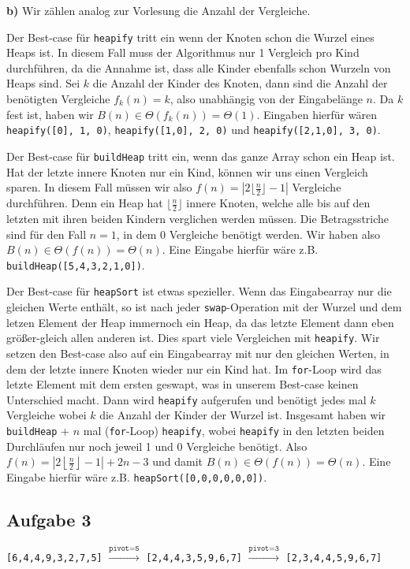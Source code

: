 \documentclass[a4paper,graphics,11pt]{article}
\newcommand{\aufgabe}[1]{\subsection*{Aufgabe #1}}
\begin{document}
\textbf{b)}
Wir zählen analog zur Vorlesung die Anzahl der Vergleiche.

Der Best-case für \texttt{heapify} tritt ein wenn der Knoten schon die
Wurzel eines Heaps ist. In diesem Fall muss der Algorithmus nur 1 Vergleich pro Kind durchführen, da die Annahme ist,
dass alle Kinder ebenfalls schon Wurzeln von Heaps sind.
Sei $k$ die Anzahl der Kinder des Knoten, dann sind die Anzahl der benötigten Vergleiche $f_k(n) = k$, also
unabhängig von der Eingabelänge $n$. Da $k$ fest ist, haben wir $B(n) \in \Theta(f_k(n)) = \Theta(1)$.
Eingaben hierfür wären \texttt{heapify([0], 1, 0)}, \texttt{heapify([1,0], 2, 0)} und \texttt{heapify([2,1,0], 3, 0)}.

Der Best-case für \texttt{buildHeap} tritt ein, wenn das ganze Array schon ein Heap ist.
Hat der letzte innere Knoten nur ein Kind, können wir uns einen Vergleich sparen. In diesem Fall müssen wir also
$f(n) = |2\lfloor \frac{n}{2} \rfloor-1|$ Vergleiche durchführen. Denn ein Heap hat $\lfloor \frac{n}{2} \rfloor$ innere
Knoten, welche alle bis auf den letzten mit ihren beiden Kindern verglichen werden müssen.
Die Betragsstriche sind für den Fall $n=1$, in dem 0 Vergleiche benötigt werden.
Wir haben also $B(n) \in \Theta(f(n)) = \Theta(n)$.
Eine Eingabe hierfür wäre z.B. \texttt{buildHeap([5,4,3,2,1,0])}.

Der Best-case für \texttt{heapSort} ist etwas spezieller. Wenn das Eingabearray nur die gleichen Werte enthält, so
ist nach jeder \texttt{swap}-Operation mit der Wurzel und dem letzen Element der Heap immernoch ein Heap, da das letzte
Element dann eben größer-gleich allen anderen ist.
Dies spart viele Vergleichen mit \texttt{heapify}.
Wir setzen den Best-case also auf ein Eingabearray mit nur den gleichen Werten,
in dem der letzte innere Knoten wieder nur ein Kind hat.
Im \texttt{for}-Loop wird das letzte Element mit dem ersten geswapt, was in unserem Best-case keinen Unterschied macht.
Dann wird \texttt{heapify} aufgerufen und benötigt jedes mal $k$ Vergleiche wobei $k$ die Anzahl der Kinder der Wurzel ist.
Insgesamt haben wir \texttt{buildHeap} + $n$ mal (\texttt{for}-Loop) \texttt{heapify},
wobei \texttt{heapify} in den letzten beiden Durchläufen nur noch jeweil 1 und 0 Vergleiche
benötigt. Also $ f(n) = \left|2\left\lfloor \frac{n}{2} \right\rfloor -1\right| + 2n - 3$
und damit $B(n) \in \Theta(f(n)) = \Theta(n)$.
Eine Eingabe hierfür wäre z.B. \texttt{heapSort([0,0,0,0,0,0])}.



\aufgabe{3}
\texttt{[6,4,4,9,3,2,7,5]} $\xrightarrow{\texttt{pivot=5}}$
\texttt{[2,4,4,3,5,9,6,7]} $\xrightarrow{\texttt{pivot=3}}$
\texttt{[2,3,4,4,5,9,6,7]}
\end{document}
